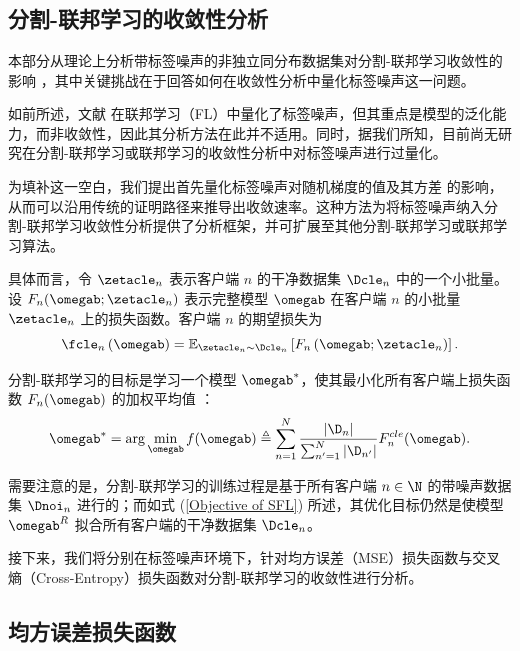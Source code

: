 \chapter{}
\section{分割-联邦学习的收敛性分析}
本部分从理论上分析带标签噪声的非独立同分布数据集对分割-联邦学习收敛性的影响 ，其中关键挑战在于回答如何在收敛性分析中量化标签噪声这一问题。



如前所述，文献\cite{ke2023impact} 在联邦学习（FL）中量化了标签噪声，但其重点是模型的泛化能力，而非收敛性，因此其分析方法在此并不适用。同时，据我们所知，目前尚无研究在分割-联邦学习或联邦学习的收敛性分析中对标签噪声进行过量化。

为填补这一空白，我们提出首先量化标签噪声对随机梯度的值及其方差 的影响，从而可以沿用传统的证明路径来推导出收敛速率。这种方法为将标签噪声纳入分割-联邦学习收敛性分析提供了分析框架，并可扩展至其他分割-联邦学习或联邦学习算法。

具体而言，令 $\zetacle_n$ 表示客户端 $n$ 的干净数据集 $\Dcle_n$ 中的一个小批量。设 $F_n(\omegab;\zetacle_n)$ 表示完整模型 $\omegab$ 在客户端 $n$ 的小批量 $\zetacle_n$ 上的损失函数。客户端 $n$ 的期望损失为  
\begin{equation}\label{eq:exp-fn}
\fcle_n\left(\omegab\right)=\mathbb{E}_{\zetacle_n\sim \Dcle_n}\left[F_n\left(\omegab;\zetacle_n\right)\right].
\end{equation}

分割-联邦学习的目标是学习一个模型 $\omegab^*$，使其最小化所有客户端上损失函数 $F_{n}(\omegab)$ 的加权平均值 \cite{b8}：
\begin{equation}\label{Objective of SFL}
\omegab^* =\arg \min_{\omegab}f(\omegab)\triangleq \sum_{n=1}^{N}\frac{|\D_n|}{\sum_{n'=1}^{N}|\D_{n'}|}F^{cle}_{n}(\omegab).
\end{equation}

需要注意的是，分割-联邦学习的训练过程是基于所有客户端 $n\in\N$ 的带噪声数据集 $\Dnoi_n$ 进行的；而如式 (\ref{Objective of SFL}) 所述，其优化目标仍然是使模型 $\omegab^R$ 拟合所有客户端的干净数据集 $\Dcle_n$。

接下来，我们将分别在标签噪声环境下，针对均方误差（MSE）损失函数与交叉熵（Cross-Entropy）损失函数对分割-联邦学习的收敛性进行分析。

\section{均方误差损失函数}\label{subsec:mse}
